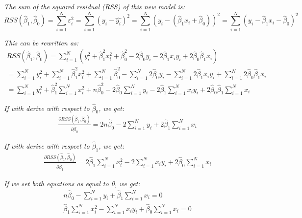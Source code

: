 \documentclass[a4paper,10pt]{article}
\begin{document}
\bigskip
\textit{The sum of the squared residual (RSS) of this new model is:}
\begin{displaymath}
  RSS(\hat{\beta}_{1},\hat{\beta}_{0}) = \sum_{i=1}^{N} \varepsilon_{i}^{2} = \sum_{i=1}^{N}(y_{i} - \hat{y_{i}})^{2} = \sum_{i=1}^{N} (y_{i} - (\hat{\beta}_{1} x_{i} + \hat{\beta}_{0}))^{2} = \sum_{i=1}^{N} (y_{i} - \hat{\beta}_{1} x_{i} - \hat{\beta}_{0})^{2}
\end{displaymath}

\textit{This can be rewritten as:}
\begin{eqnarray*}
  RSS(\hat{\beta}_{1},\hat{\beta}_{0}) = \sum_{i=1}^{N} (y_{i}^2 + \hat{\beta}_{1}^2 x_{i}^2 + \hat{\beta}_{0}^2 - 2\hat{\beta}_{0} y_{i} - 2\hat{\beta}_{1} x_{i} y_{i} + 2 \hat{\beta}_{0} \hat{\beta}_{1} x_{i})
  \\= \sum_{i=1}^{N} y_{i}^2 + \sum_{i=1}^{N} \hat{\beta}_{1}^2 x_{i}^2 + \sum_{i=1}^{N} \hat{\beta}_{0}^2 - \sum_{i=1}^{N} 2\hat{\beta}_{0} y_{i} - \sum_{i=1}^{N} 2\hat{\beta}_{1} x_{i} y_{i} + \sum_{i=1}^{N} 2 \hat{\beta}_{0} \hat{\beta}_{1} x_{i}
  \\= \sum_{i=1}^{N} y_{i}^2 + \hat{\beta}_{1}^2 \sum_{i=1}^{N} x_{i}^2 + n \hat{\beta}_{0}^2 - 2\hat{\beta}_{0} \sum_{i=1}^{N}  y_{i} - 2\hat{\beta}_{1} \sum_{i=1}^{N}  x_{i} y_{i} + 2 \hat{\beta}_{0} \hat{\beta}_{1} \sum_{i=1}^{N}  x_{i}
\end{eqnarray*}

\textit{If with derive with respect to $\hat{\beta}_{0}$, we get:}
\begin{eqnarray*}
  \frac{\partial RSS(\hat{\beta}_{1},\hat{\beta}_{0})}{\partial \hat{\beta}_{0}} = 2 n \hat{\beta}_{0} - 2 \sum_{i=1}^{N}  y_{i} + 2 \hat{\beta}_{1} \sum_{i=1}^{N}  x_{i}
\end{eqnarray*}

\textit{If with derive with respect to $\hat{\beta}_{1}$, we get:}
\begin{eqnarray*}
  \frac{\partial RSS(\hat{\beta}_{1},\hat{\beta}_{0})}{\partial \hat{\beta}_{1}} = 2 \hat{\beta}_{1} \sum_{i=1}^{N} x_{i}^2 - 2 \sum_{i=1}^{N}  x_{i} y_{i} + 2 \hat{\beta}_{0} \sum_{i=1}^{N}  x_{i}
\end{eqnarray*}

\textit{If we set both equations as equal to 0, we get:}
\begin{eqnarray}
  n \hat{\beta}_{0} - \sum_{i=1}^{N}  y_{i} + \hat{\beta}_{1} \sum_{i=1}^{N}  x_{i} = 0
  \\ \hat{\beta}_{1} \sum_{i=1}^{N} x_{i}^2 - \sum_{i=1}^{N}  x_{i} y_{i} + \hat{\beta}_{0} \sum_{i=1}^{N}  x_{i} = 0
\end{eqnarray}
\end{document}
